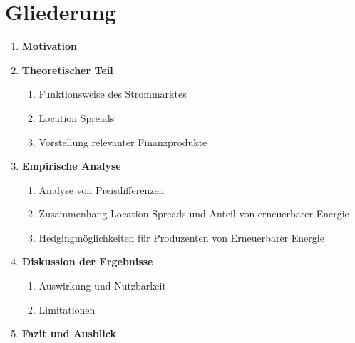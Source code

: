 \section{Gliederung}
\vspace{0.5cm}
\begin{enumerate}
    \item \textbf{Motivation}
    \item \textbf{Theoretischer Teil}
        \begin{enumerate}[label=\theenumi.\arabic*]
            \item Funktionsweise des Strommarktes
            \item Location Spreads
            \item Vorstellung relevanter Finanzprodukte
        \end{enumerate}
    \item \textbf{Empirische Analyse}
        \begin{enumerate}[label=\theenumi.\arabic*]

        
            \item Analyse von Preisdifferenzen
            \item Zusammenhang Location Spreads und Anteil von erneuerbarer Energie
            \item Hedgingmöglichkeiten für Produzenten von Erneuerbarer Energie
        \end{enumerate}
    \item \textbf{Diskussion der Ergebnisse}
         \begin{enumerate}[label=\theenumi.\arabic*]
            \item Auswirkung und Nutzbarkeit
            \item Limitationen
        \end{enumerate}
    \item \textbf{Fazit und Ausblick}
\end{enumerate}




